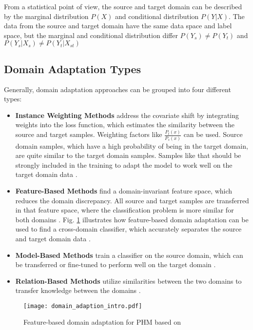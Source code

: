 From a statistical point of view, the source and target domain can be described by the marginal distribution $P(X)$ and conditional distribution $P(Y|X)$. The data from the source and target domain have the same data space and label space, but the marginal and conditional distribution differ $P(Y_{s}) \neq P(Y_{t})$ and $P(Y_{s}|X_{s}) \neq P(Y_{t}|X_{st})$ \cite{Qikang2020}

\subsection{Domain Adaptation Types}
Generally, domain adaptation approaches can be grouped into four different types:  

\begin{itemize}
\item \textbf{Instance Weighting Methods} address the covariate shift by integrating weights into the loss function, which estimates the similarity between the source and target samples. Weighting factors like $\frac{P_{t}(x)}{P_{s}(x)}$ can be used. Source domain samples, which have a high probability of being in the target domain, are quite similar to the target domain samples. Samples like that should be strongly included in the training to adapt the model to work well on the target domain data \cite{AZAMFAR2020103932}.
\item \textbf{Feature-Based Methods} find a domain-invariant feature space, which reduces the domain discrepancy. All source and target samples are transferred in that feature space, where the classification problem is more similar for both domains \cite{AZAMFAR2020103932}. Fig. \ref{fig:Domain_adaption_intro} illustrates how feature-based domain adaptation can be used to find a cross-domain classifier, which accurately separates the source and target domain data \cite{AZAMFAR2020103932}. 
\item \textbf{Model-Based Methods} train a classifier on the source domain, which can be transferred or fine-tuned to perform well on the target domain \cite{AZAMFAR2020103932}.
\item \textbf{Relation-Based Methods} utilize similarities between the two domains to transfer knowledge between the domains \cite{AZAMFAR2020103932}. 
\end{itemize}

\begin{figure}[H]
  \centering
  \texttt{[image: domain\_adaption\_intro.pdf]}
  \caption {Feature-based domain adaptation for PHM based on \cite{Pandhare2021}} \label{fig:Domain_adaption_intro}
\end{figure}


